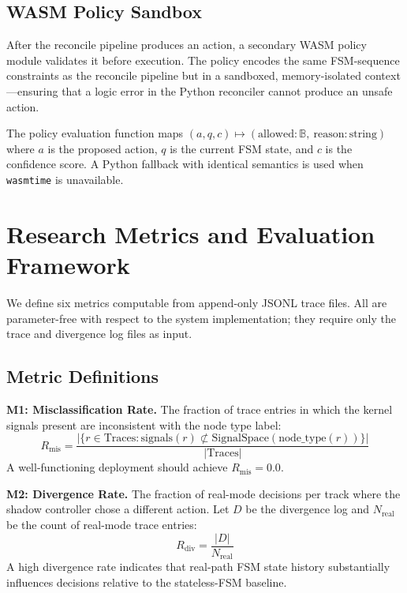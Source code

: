 \documentclass[runningheads]{llncs}
\begin{document}
\subsection{WASM Policy Sandbox}

After the reconcile pipeline produces an action, a secondary WASM
policy module validates it before execution.  The policy encodes the
same FSM-sequence constraints as the reconcile pipeline but in a
sandboxed, memory-isolated context---ensuring that a logic error in the
Python reconciler cannot produce an unsafe action.

The policy evaluation function maps $(a, q, c) \mapsto
(\text{allowed}: \mathbb{B},\ \text{reason}: \text{string})$ where
$a$ is the proposed action, $q$ is the current FSM state, and $c$ is
the confidence score.  A Python fallback with identical semantics is
used when \texttt{wasmtime} is unavailable.

\section{Research Metrics and Evaluation Framework}
\label{sec:metrics}

We define six metrics computable from append-only JSONL trace files.
All are parameter-free with respect to the system implementation;
they require only the trace and divergence log files as input.

\subsection{Metric Definitions}

\noindent\textbf{M1: Misclassification Rate.}
The fraction of trace entries in which the kernel signals present are
inconsistent with the node type label:
\begin{equation}
  R_\text{mis} = \frac{|\{r \in \text{Traces} : \text{signals}(r)
    \not\subset \text{SignalSpace}(\text{node\_type}(r))\}|}{|\text{Traces}|}
  \label{eq:mis}
\end{equation}
A well-functioning deployment should achieve $R_\text{mis} = 0.0$.

\noindent\textbf{M2: Divergence Rate.}
The fraction of real-mode decisions per track where the shadow
controller chose a different action.  Let $D$ be the divergence log
and $N_\text{real}$ be the count of real-mode trace entries:
\begin{equation}
  R_\text{div} = \frac{|D|}{N_\text{real}}
  \label{eq:div}
\end{equation}
A high divergence rate indicates that real-path FSM state history
substantially influences decisions relative to the
stateless-FSM baseline.
\end{document}
